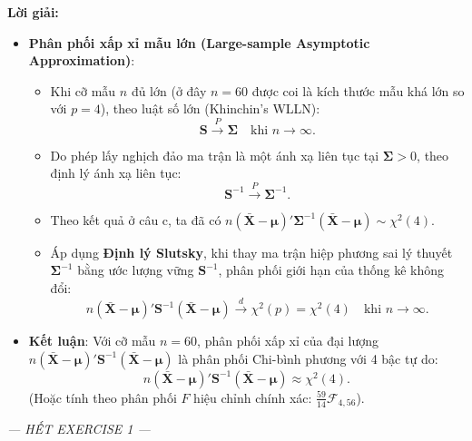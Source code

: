\documentclass[11pt,a4paper]{article}
\newenvironment{solution}{%
  \par\noindent\textbf{Lời giải:}\ \ignorespaces
}{\par}
\theoremstyle{definition}
\newcommand{\answer}[1]{\boxed{#1}}
\begin{document}
\begin{solution}
\begin{enumerate}[label=\textbf{\alph*)}]
\begin{itemize}
    \item \textbf{Phân phối xấp xỉ mẫu lớn (Large-sample Asymptotic Approximation)}:
    \begin{itemize}
      \item Khi cỡ mẫu $n$ đủ lớn (ở đây $n = 60$ được coi là kích thước mẫu khá lớn so với $p = 4$), theo luật số lớn (Khinchin's WLLN):
      \[
      \mathbf{S} \xrightarrow{P} \boldsymbol{\Sigma} \quad \text{khi } n \to \infty.
      \]
      \item Do phép lấy nghịch đảo ma trận là một ánh xạ liên tục tại $\boldsymbol{\Sigma} > 0$, theo định lý ánh xạ liên tục:
      \[
      \mathbf{S}^{-1} \xrightarrow{P} \boldsymbol{\Sigma}^{-1}.
      \]
      \item Theo kết quả ở câu c, ta đã có $n(\bar{\mathbf{X}} - \boldsymbol{\mu})' \boldsymbol{\Sigma}^{-1} (\bar{\mathbf{X}} - \boldsymbol{\mu}) \sim \chi^2(4)$.
      \item Áp dụng \textbf{Định lý Slutsky}, khi thay ma trận hiệp phương sai lý thuyết $\boldsymbol{\Sigma}^{-1}$ bằng ước lượng vững $\mathbf{S}^{-1}$, phân phối giới hạn của thống kê không đổi:
      \[
      n(\bar{\mathbf{X}} - \boldsymbol{\mu})' \mathbf{S}^{-1} (\bar{\mathbf{X}} - \boldsymbol{\mu}) \xrightarrow{d} \chi^2(p) = \chi^2(4) \quad \text{khi } n \to \infty.
      \]
    \end{itemize}
    \item \textbf{Kết luận}:
    Với cỡ mẫu $n = 60$, phân phối xấp xỉ của đại lượng $n(\bar{\mathbf{X}} - \boldsymbol{\mu})' \mathbf{S}^{-1} (\bar{\mathbf{X}} - \boldsymbol{\mu})$ là phân phối Chi-bình phương với 4 bậc tự do:
    \[
    n(\bar{\mathbf{X}} - \boldsymbol{\mu})' \mathbf{S}^{-1} (\bar{\mathbf{X}} - \boldsymbol{\mu}) \approx \answer{\chi^2(4)}.
    \]
    (Hoặc tính theo phân phối $F$ hiệu chỉnh chính xác: $\frac{59}{14} \mathcal{F}_{4, 56}$).
  \end{itemize}
\end{enumerate}
\end{solution}

\vfill
\begin{center}
{\small\itshape --- HẾT EXERCISE 1 ---}
\end{center}
\end{document}
